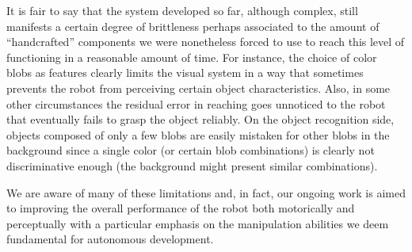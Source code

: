 It is fair to say that the system developed so far, although complex, still manifests a certain degree of brittleness perhaps associated to the amount of ``handcrafted'' components we were nonetheless forced to use to reach this level of functioning in a reasonable amount of time. For instance, the choice of color blobs as features clearly limits the visual system in a way that sometimes prevents the robot from perceiving certain object characteristics. Also, in some other circumstances the residual error in reaching goes unnoticed to the robot that eventually fails to grasp the object reliably. On the object recognition side, objects composed of only a few blobs are easily mistaken for other blobs in the background since a single color (or certain blob combinations) is clearly not discriminative enough (the background might present similar combinations). 

We are aware of many of these limitations and, in fact, our ongoing work is aimed to improving the overall performance of the robot both motorically and perceptually with a particular emphasis on the manipulation abilities we deem fundamental for autonomous development.




